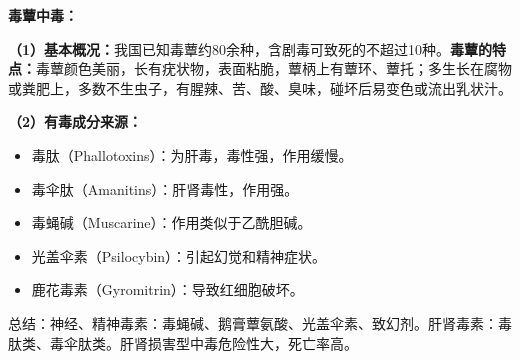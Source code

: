 \begin{keybox}
\textbf{毒蕈中毒：}

\textbf{（1）基本概况：}我国已知毒蕈约80余种，含剧毒可致死的不超过10种。\textbf{毒蕈的特点：}毒蕈颜色美丽，长有疣状物，表面粘脆，蕈柄上有蕈环、蕈托；多生长在腐物或粪肥上，多数不生虫子，有腥辣、苦、酸、臭味，碰坏后易变色或流出乳状汁。

\textbf{（2）有毒成分来源：}
\begin{itemize}[leftmargin=*]
    \item 毒肽（Phallotoxins）：为肝毒，毒性强，作用缓慢。
    \item 毒伞肽（Amanitins）：肝肾毒性，作用强。
    \item 毒蝇碱（Muscarine）：作用类似于乙酰胆碱。
    \item 光盖伞素（Psilocybin）：引起幻觉和精神症状。
    \item 鹿花毒素（Gyromitrin）：导致红细胞破坏。
\end{itemize}
总结：神经、精神毒素：毒蝇碱、鹅膏蕈氨酸、光盖伞素、致幻剂。肝肾毒素：毒肽类、毒伞肽类。肝肾损害型中毒危险性大，死亡率高。


\end{keybox}
